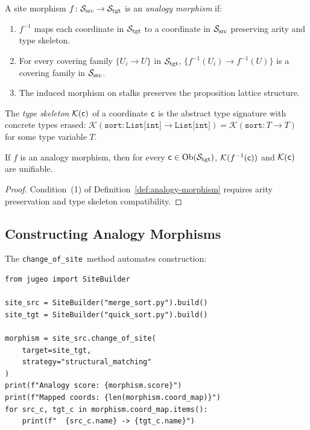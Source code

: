 \documentclass[11pt]{article}
\newcommand{\ChangeOfSite}{\texttt{change\_of\_site}}
\newcommand{\SourceSite}{\Site_{\mathrm{src}}}
\newcommand{\TargetSite}{\Site_{\mathrm{tgt}}}
\newcommand{\StructSkel}{\mathcal{K}}
\begin{document}
\begin{definition}\label{def:analogy-morphism}
A site morphism $f \colon \SourceSite \to \TargetSite$ is an
\emph{analogy morphism} if:
\begin{enumerate}[noitemsep]
  \item $f^{-1}$ maps each coordinate in $\TargetSite$ to a
        coordinate in $\SourceSite$ preserving arity and type skeleton.
  \item For every covering family $\{U_i \to U\}$ in $\TargetSite$,
        $\{f^{-1}(U_i) \to f^{-1}(U)\}$ is a covering family in
        $\SourceSite$.
  \item The induced morphism on stalks preserves the proposition
        lattice structure.
\end{enumerate}
\end{definition}

\begin{definition}\label{def:type-skeleton}
The \emph{type skeleton} $\StructSkel(\coord)$ of a coordinate $\mathsf{c}$
is the abstract type signature with concrete types erased:
$\StructSkel(\texttt{sort}: \texttt{List[int]} \to \texttt{List[int]}) =
\StructSkel(\texttt{sort}: T \to T)$ for some type variable $T$.
\end{definition}

\begin{proposition}\label{prop:skeleton-pres}
If $f$ is an analogy morphism, then for every
$\coord \in \Ob(\TargetSite)$,
$\StructSkel(f^{-1}(\coord))$ and $\StructSkel(\coord)$ are unifiable.
\end{proposition}

\begin{proof}
Condition~(1) of Definition~\ref{def:analogy-morphism} requires
arity preservation and type skeleton compatibility.
\end{proof}

\subsection{Constructing Analogy Morphisms}
The \ChangeOfSite\ method automates construction:

\begin{lstlisting}[style=jugeo-python]
from jugeo import SiteBuilder

site_src = SiteBuilder("merge_sort.py").build()
site_tgt = SiteBuilder("quick_sort.py").build()

morphism = site_src.change_of_site(
    target=site_tgt,
    strategy="structural_matching"
)
print(f"Analogy score: {morphism.score}")
print(f"Mapped coords: {len(morphism.coord_map)}")
for src_c, tgt_c in morphism.coord_map.items():
    print(f"  {src_c.name} -> {tgt_c.name}")
\end{lstlisting}
\end{document}
